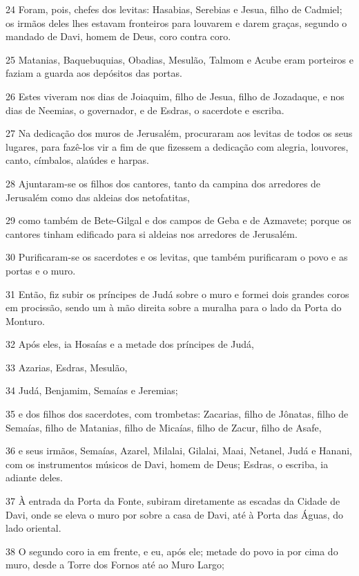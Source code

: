 \par 24 Foram, pois, chefes dos levitas: Hasabias, Serebias e Jesua, filho de Cadmiel; os irmãos deles lhes estavam fronteiros para louvarem e darem graças, segundo o mandado de Davi, homem de Deus, coro contra coro.
\par 25 Matanias, Baquebuquias, Obadias, Mesulão, Talmom e Acube eram porteiros e faziam a guarda aos depósitos das portas.
\par 26 Estes viveram nos dias de Joiaquim, filho de Jesua, filho de Jozadaque, e nos dias de Neemias, o governador, e de Esdras, o sacerdote e escriba.
\par 27 Na dedicação dos muros de Jerusalém, procuraram aos levitas de todos os seus lugares, para fazê-los vir a fim de que fizessem a dedicação com alegria, louvores, canto, címbalos, alaúdes e harpas.
\par 28 Ajuntaram-se os filhos dos cantores, tanto da campina dos arredores de Jerusalém como das aldeias dos netofatitas,
\par 29 como também de Bete-Gilgal e dos campos de Geba e de Azmavete; porque os cantores tinham edificado para si aldeias nos arredores de Jerusalém.
\par 30 Purificaram-se os sacerdotes e os levitas, que também purificaram o povo e as portas e o muro.
\par 31 Então, fiz subir os príncipes de Judá sobre o muro e formei dois grandes coros em procissão, sendo um à mão direita sobre a muralha para o lado da Porta do Monturo.
\par 32 Após eles, ia Hosaías e a metade dos príncipes de Judá,
\par 33 Azarias, Esdras, Mesulão,
\par 34 Judá, Benjamim, Semaías e Jeremias;
\par 35 e dos filhos dos sacerdotes, com trombetas: Zacarias, filho de Jônatas, filho de Semaías, filho de Matanias, filho de Micaías, filho de Zacur, filho de Asafe,
\par 36 e seus irmãos, Semaías, Azarel, Milalai, Gilalai, Maai, Netanel, Judá e Hanani, com os instrumentos músicos de Davi, homem de Deus; Esdras, o escriba, ia adiante deles.
\par 37 À entrada da Porta da Fonte, subiram diretamente as escadas da Cidade de Davi, onde se eleva o muro por sobre a casa de Davi, até à Porta das Águas, do lado oriental.
\par 38 O segundo coro ia em frente, e eu, após ele; metade do povo ia por cima do muro, desde a Torre dos Fornos até ao Muro Largo;
